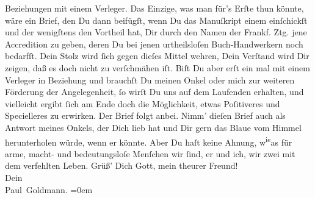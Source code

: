 \begin{ledgroupsized}[t]{13cm}
               Beziehungen mit einem Verleger. {\pb}Das Einzige, was
               man für’s Erſte thun könnte, wäre ein Brief, den Du dann beifügſt, wenn Du das Manuſkript einem \label{K_L02709-6v}\label{K_L02709-6h} einſchickſt und der
               wenigſtens den Vortheil hat, Dir durch den Namen der Frankf. Ztg. jene Accredition zu geben, deren Du bei jenen urtheilsloſen
               Buch-Handwerkern noch bedarfſt. Dein Stolz wird ſich gegen dieſes Mittel wehren, Dein
               Verſtand wird Dir zeigen, daß es doch {\pb}nicht zu
               verſchmähen iſt. Biſt Du aber erſt ein mal mit einem Verleger in Beziehung und brauchſt Du meinen Onkel oder mich zur weiteren
               Förderung der Angelegenheit, ſo wirſt Du uns auf dem Laufenden erhalten, und
               vielleicht ergibt ſich am Ende doch die Möglichkeit, etwas Poſitiveres und
               Specielleres zu erwirken.\pend
           \pstart
           Der Brief folgt anbei. {\pb}Nimm' dieſen Brief auch als Antwort meines Onkels, der Dich lieb hat und
               Dir gern das Blaue vom Himmel herunterholen würde, wenn er könnte. Aber Du haſt keine
               Ahnung, w\substVorne{}\textsuperscript{ie}\substDazwischen{}as\substHinten{} für arme, macht- und bedeutungsloſe
               Menſchen wir ſind, er und ich, wir zwei mit dem verfehlten Leben.\pend
           \pstart
           Grüß’ Dich Gott, mein theurer Freund! {\\[\baselineskip]}Dein {\\[\baselineskip]}\spacefill\mbox{Paul Goldmann.}\pend
           \leftskip=0em{}
         
         \endnumbering{}\end{ledgroupsized}\begin{anhang}\end{anhang}\newcommand{\dateiname}{L02709}\newcommand{\titel}{Paul Goldmann an Arthur Schnitzler, 3. 6. 1893}\newcommand{\editorInnen}{Martin Anton Müller und Laura Untner}
            \footnotesize
\begin{ledgroupsized}[t]{11.5cm}
\end{ledgroupsized}
         
      